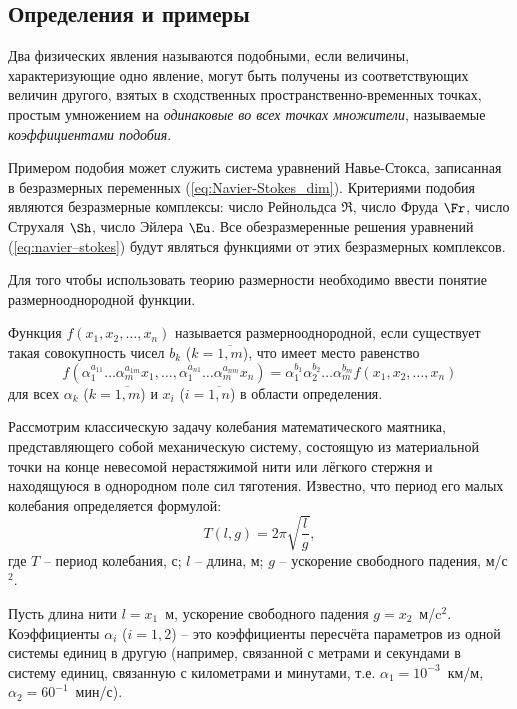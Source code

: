 \documentclass[a4paper, 14pt]{extarticle}
\begin{document}
\subsection{Определения и примеры}

\begin{dfn}
	Два физических явления называются \alert{подобными}, если величины, характеризующие одно явление, могут быть получены из соответствующих величин другого, взятых в сходственных пространственно-вре\-мен\-ных точках, простым умножением на \textit{одинаковые во всех точках множители}, называемые \textit{коэффициентами подобия}.
\end{dfn}

Примером подобия может служить система уравнений Навье-Стокса, записанная в безразмерных переменных (\ref{eq:Navier-Stokes_dim}). Критериями подобия являются безразмерные комплексы: число Рейнольдса $\Re$, число Фруда $\Fr$, число Струхаля $\Sh$, число Эйлера $\Eu$. Все обезразмеренные решения уравнений (\ref{eq:navier–stokes}) будут являться функциями от этих безразмерных комплексов.

Для того чтобы использовать теорию размерности необходимо ввести понятие \alert{размернооднородной} функции. 

\begin{dfn}
	Функция $f(x_1, x_2, \ldots, x_n)$ называется \alert{размернооднородной}, если существует такая совокупность чисел $b_k$ ($k=\overline{1,m}$), что имеет место равенство
	\begin{equation}
	\label{eq:dimension_uniform_function_dfn}
	f(\alpha_1^{a_{11}}\ldots \alpha_m^{a_{1m}}x_1,\ldots,
	\alpha_1^{a_{n1}}\ldots \alpha_m^{a_{nm}}x_n) = 
	\alpha_1^{b_1}\alpha_2^{b_2}\ldots \alpha_m^{b_m} f(x_1, x_2, \ldots, x_n)
	\end{equation}
	для всех $\alpha_k$ ($k=\overline{1,m}$) и $x_i$ ($i=\overline{1,n}$) в области определения.
\end{dfn}

Рассмотрим классическую задачу колебания математического маятника, представляющего собой механическую систему, состоящую из материальной точки на конце невесомой нерастяжимой нити или лёгкого стержня и находящуюся в однородном поле сил тяготения. Известно, что период его \alert{малых} колебания определяется формулой:
\[
T(l, g) = 2 \pi \sqrt{\frac{l}{g}},
\]
где $T$ -- период колебания, с; $l$ -- длина, м; $g$ -- ускорение свободного падения, м/с$^2$.

Пусть длина нити $l = x_1$~м, ускорение свободного падения $g = x_2$~м/c$^2$. Коэффициенты $\alpha_i$ ($i=1,2$) -- это коэффициенты пересчёта параметров из одной системы единиц в другую (например, связанной с метрами и секундами в систему единиц, связанную с километрами и минутами, т.е. $\alpha_1 = 10^{-3}$~км/м, $\alpha_2 = 60^{-1}$~мин/с).
\end{document}
